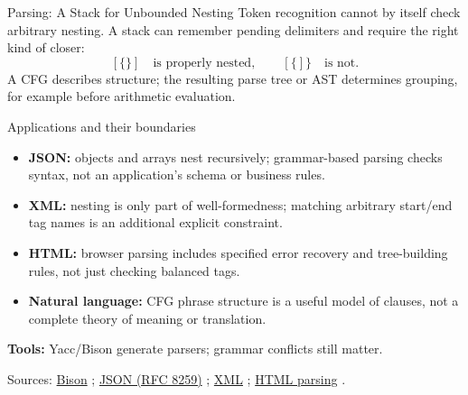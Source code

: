 \documentclass[10pt]{beamer}
\newcommand{\paperlink}[2]{%
  \href{#1}{\textcolor{blue!65!black}{#2}}%
}
\begin{document}
\begin{frame}{Parsing: A Stack for Unbounded Nesting}
  \small
  Token recognition cannot by itself check arbitrary nesting. A stack can
  remember pending delimiters and require the right kind of closer:
  \[
    [\{\}]\quad\text{is properly nested},\qquad
    [\{]\}\quad\text{is not}.
  \]
  A CFG describes structure; the resulting parse tree or AST determines
  grouping, for example before arithmetic evaluation.
  \pause
  \begin{block}{Applications and their boundaries}
    \begin{itemize}
      \item \textbf{JSON:} objects and arrays nest recursively; grammar-based
        parsing checks syntax, not an application's schema or business rules.
      \item \textbf{XML:} nesting is only part of well-formedness; matching
        arbitrary start/end tag names is an additional explicit constraint.
      \item \textbf{HTML:} browser parsing includes specified error recovery
        and tree-building rules, not just checking balanced tags.
      \item \textbf{Natural language:} CFG phrase structure is a useful model
        of clauses, not a complete theory of meaning or translation.
    \end{itemize}
  \end{block}
  \pause
  \textbf{Tools:} Yacc/Bison generate parsers; grammar conflicts still matter.
  \par\smallskip
  {\scriptsize Sources: \paperlink{https://www.gnu.org/software/bison/manual/html_node/Language-and-Grammar.html}{Bison};
  \paperlink{https://www.rfc-editor.org/rfc/rfc8259}{JSON (RFC 8259)};
  \paperlink{https://www.w3.org/TR/xml/}{XML};
  \paperlink{https://html.spec.whatwg.org/multipage/parsing.html}{HTML parsing}.}
\end{frame}
\end{document}

